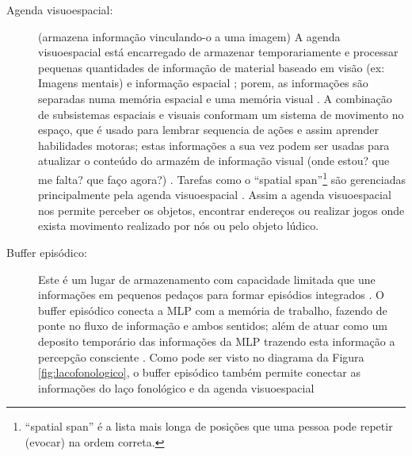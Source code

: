 \begin{description}
\item[Agenda visuoespacial:] (armazena informação vinculando-o a uma imagem)
\label{reflabel:visuoespacial}
A agenda visuoespacial está encarregado de armazenar temporariamente  e processar pequenas quantidades de informação
de material baseado em visão (ex: Imagens mentais) e informação espacial
\cite[pp. 678]{spreen2006compendium} \cite[pp. 124]{pake2019psicologia};
porem, as informações são separadas numa memória  espacial e uma memória visual \cite[pp. 124]{pake2019psicologia}.
A combinação de  subsistemas espaciais e visuais conformam um sistema de movimento no espaço, 
que é usado para lembrar sequencia de ações e assim aprender habilidades motoras;
estas informações a sua vez podem ser usadas para atualizar o conteúdo do armazém de informação visual
(onde estou? que me falta? que faço agora?)
\cite[pp. 274]{braisby2012cognitive} \cite[pp. 125]{pake2019psicologia}.
Tarefas como o ``spatial span''\footnote{``spatial span'' é a lista mais longa de posições que uma 
pessoa pode repetir (evocar) na ordem correta.} 
são gerenciadas principalmente pela agenda visuoespacial 
\cite[pp. 678]{spreen2006compendium}.
Assim a agenda visuoespacial nos permite perceber os objetos, 
encontrar endereços ou realizar jogos onde exista movimento realizado por nós ou pelo objeto lúdico. 


\item[Buffer episódico:] 
Este é um lugar de armazenamento com capacidade limitada que une informações em 
pequenos pedaços para formar episódios integrados 
\cite[pp. 678]{spreen2006compendium} \cite[pp. 126]{pake2019psicologia}.
O buffer episódico conecta a MLP com a memória de trabalho, 
fazendo de ponte no fluxo de informação e ambos sentidos;
além de atuar como um deposito temporário das informações da MLP
trazendo esta informação a percepção consciente
\cite[pp. 126]{pake2019psicologia} \cite[pp. 283-284]{braisby2012cognitive}.
Como pode ser visto no diagrama da Figura \ref{fig:lacofonologico}, 
o buffer episódico também permite conectar as informações do laço fonológico e da agenda visuoespacial
\end{description}
